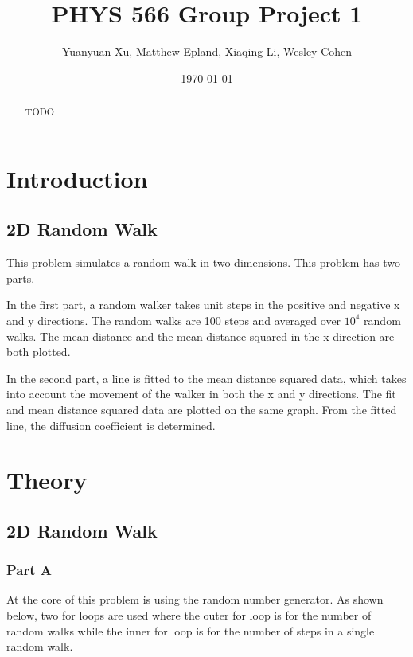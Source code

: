 \documentclass[notitlepage,aps,prd,nofootinbib]{revtex4-1}
\begin{document}
\title{PHYS 566 Group Project 1}
\author{Yuanyuan Xu, Matthew Epland, Xiaqing Li, Wesley Cohen}

\date{\today}

\begin{abstract}
TODO
\end{abstract}\maketitle

\section{Introduction}
\label{sec:intro}
\subsection{2D Random Walk}
\noindent This problem simulates a random walk in two dimensions. This problem has two parts. \newline

\noindent In the first part, a random walker takes unit steps in the positive and negative x and y directions. The random walks are 100 steps and averaged over $10^4$ random walks. The mean distance and the mean distance squared in the x-direction are both plotted. \newline

\noindent In the second part, a line is fitted to the mean distance squared data, which takes into account the movement of the walker in both the x and y directions. The fit and mean distance squared data are plotted on the same graph. From the fitted line, the diffusion coefficient is determined.

\section{Theory}
\label{sec:theory}
\subsection{2D Random Walk}
\label{subsec:theory_1}

\subsubsection{Part A}

\noindent At the core of this problem is using the random number generator. As shown below, two for loops are used where the outer for loop is for the number of random walks while the inner for loop is for the number of steps in a single random walk. \newline
\end{document}
